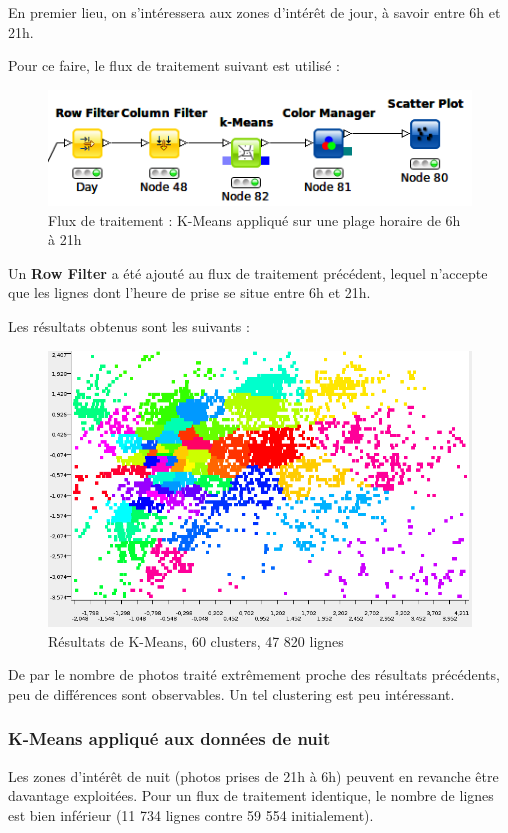 En premier lieu, on s'intéressera aux zones d'intérêt de jour, à savoir entre 6h et 21h.

Pour ce faire, le flux de traitement suivant est utilisé :
\begin{figure}[H]
    \centering
    \includegraphics[width=0.8\linewidth]{img/knime_k-means_day.png}
    \caption{Flux de traitement : K-Means appliqué sur une plage horaire de 6h à 21h}
\end{figure}

Un \textbf{Row Filter} a été ajouté au flux de traitement précédent, lequel n'accepte que les lignes dont l'heure de prise se situe entre 6h et 21h.

Les résultats obtenus sont les suivants :
\begin{figure}[H]
    \centering
    \includegraphics[width=\linewidth]{img/60_means_day.png}
    \caption{Résultats de K-Means, 60 clusters, 47 820 lignes}
\end{figure}

De par le nombre de photos traité extrêmement proche des résultats précédents, peu de différences sont observables. Un tel clustering est peu intéressant.



\subsubsection{K-Means appliqué aux données de nuit}
Les zones d'intérêt de nuit (photos prises de 21h à 6h) peuvent en revanche être davantage exploitées. Pour un flux de traitement identique, le nombre de lignes est bien inférieur (11 734 lignes contre 59 554 initialement).

